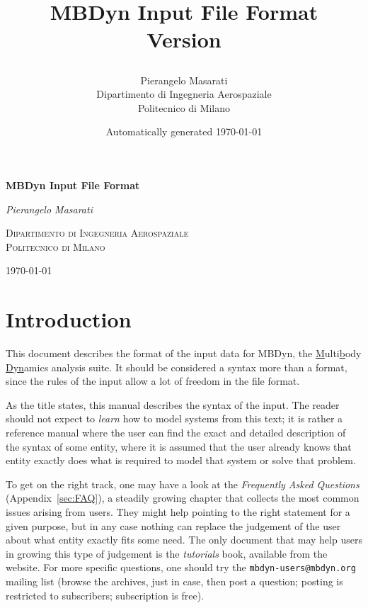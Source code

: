 \documentclass[10pt,dvips]{report}
\newcommand{\kw}[1]{\texttt{#1}}
\begin{document}
\begin{latexonly}
\title{\bf MBDyn Input File Format \\
Version

}
\author{Pierangelo Masarati \vspace{5mm}\\
    \sc Dipartimento di Ingegneria Aerospaziale \\
    \sc Politecnico di Milano}
\date{Automatically generated \today}
\maketitle
\end{latexonly}

\begin{htmlonly}
\begin{center}
\textbf{\LARGE MBDyn Input File Format}

\emph{\large Pierangelo Masarati}

\textsc{Dipartimento di Ingegneria Aerospaziale \\ Politecnico di Milano}

\today
\end{center}
\end{htmlonly}

\tableofcontents
\newpage
\listoffigures
\newpage
\listoftables
\newpage

\chapter*{Introduction}
This document describes the format of the input data for MBDyn,
the \underline{M}ulti\underline{b}ody \underline{Dyn}amics analysis suite.
It should be considered a syntax more than a format, since the rules of the
input allow a lot of freedom in the file format. 

As the title states, this manual describes the syntax of the input.
The reader should not expect to \emph{learn} how to model systems
from this text; it is rather a reference manual where the user
can find the exact and detailed description of the syntax of some
entity, where it is assumed that the user already knows that entity
exactly does what is required to model that system or solve that problem.

To get on the right track, one may have a look at the 
\emph{Frequently Asked Questions} (Appendix~\ref{sec:FAQ}),
a steadily growing chapter that collects the most common issues
arising from users.
They might help pointing to the right statement for a given purpose,
but in any case nothing can replace the judgement of the user
about what entity exactly fits some need.
The only document that may help users in growing this type of judgement
is the \emph{tutorials} book, available from the website.
For more specific questions, one should try the \kw{mbdyn-users@mbdyn.org}
mailing list (browse the archives, just in case, then post a question;
posting is restricted to subscribers; subscription is free).
\end{document}
